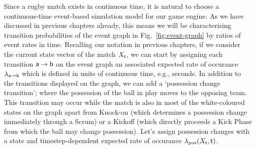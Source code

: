 Since a rugby match exists in continuous time, it is natural to choose a continuous-time event-based simulation model for our game engine. As we have discussed in previous chapters already, this means we will be characterising transition probabilities of the event graph in Fig.~\ref{fig:event-graph} by ratios of event rates in time. Recalling our notation in previous chapters, if we consider the current state vector of the match $X_{\sf t}$, we can start by assigning each transition ${\sf a}\rightarrow {\sf b}$ on the event graph an associated expected rate of occurance $\lambda_{{\sf a}\rightarrow {\sf b}}$ which is defined in units of continuous time, e.g., seconds. In addition to the transitions displayed on the graph, we can add a `possession change transition'; where the possession of the ball in play moves to the opposing team. This transition may occur while the match is also in most of the white-coloured states on the graph apart from {\sf Knock-on} (which determines a possession change immediately through a {\sf Scrum}) or a {\sf Kickoff} (which directly proceeds a {\sf Kick Phase} from which the ball may change possession). Let's assign possession changes with a state and timestep-dependent expected rate of occurance $\lambda_{\rm pos}(X_{\sf t}, {\sf t})$.

